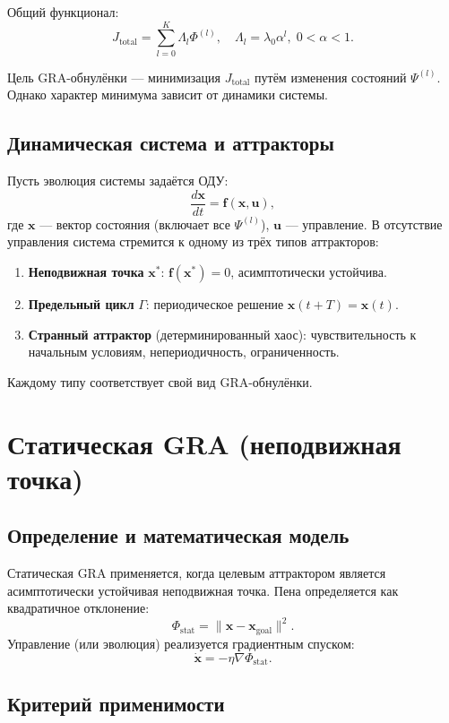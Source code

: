 \documentclass[12pt,a4paper]{article}
\begin{document}
Общий функционал:
\[
J_{\text{total}} = \sum_{l=0}^{K} \Lambda_l \Phi^{(l)}, \quad \Lambda_l = \lambda_0 \alpha^l,\;0<\alpha<1.
\]

Цель GRA-обнулёнки — минимизация \(J_{\text{total}}\) путём изменения состояний \(\Psi^{(l)}\). Однако характер минимума зависит от динамики системы.

\subsection{Динамическая система и аттракторы}

Пусть эволюция системы задаётся ОДУ:
\[
\frac{d\mathbf{x}}{dt} = \mathbf{f}(\mathbf{x}, \mathbf{u}),
\]
где \(\mathbf{x}\) — вектор состояния (включает все \(\Psi^{(l)}\)), \(\mathbf{u}\) — управление. В отсутствие управления система стремится к одному из трёх типов аттракторов:

\begin{enumerate}
    \item \textbf{Неподвижная точка} \(\mathbf{x}^*\): \(\mathbf{f}(\mathbf{x}^*)=0\), асимптотически устойчива.
    \item \textbf{Предельный цикл} \(\Gamma\): периодическое решение \(\mathbf{x}(t+T)=\mathbf{x}(t)\).
    \item \textbf{Странный аттрактор} (детерминированный хаос): чувствительность к начальным условиям, непериодичность, ограниченность.
\end{enumerate}

Каждому типу соответствует свой вид GRA-обнулёнки.

\section{Статическая GRA (неподвижная точка)}

\subsection{Определение и математическая модель}

Статическая GRA применяется, когда целевым аттрактором является асимптотически устойчивая неподвижная точка. Пена определяется как квадратичное отклонение:
\[
\Phi_{\text{stat}} = \|\mathbf{x} - \mathbf{x}_{\text{goal}}\|^2.
\]
Управление (или эволюция) реализуется градиентным спуском:
\[
\dot{\mathbf{x}} = -\eta \nabla \Phi_{\text{stat}}.
\]

\subsection{Критерий применимости}
\end{document}
